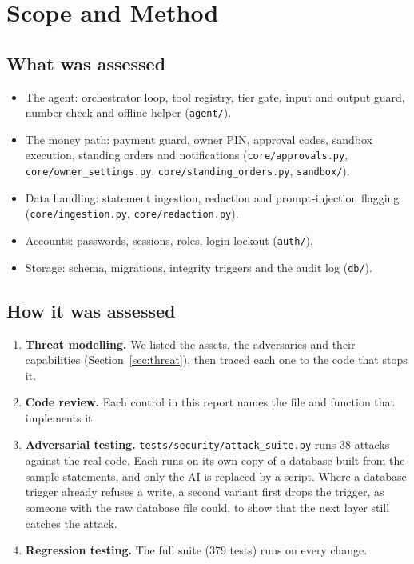 \documentclass[10pt,a4paper]{article}
\newcommand{\code}[1]{\texttt{\small #1}}
\begin{document}
\section{Scope and Method}

\subsection{What was assessed}
\begin{itemize}
  \item The agent: orchestrator loop, tool registry, tier gate, input and output guard, number check and offline helper (\code{agent/}).
  \item The money path: payment guard, owner PIN, approval codes, sandbox execution, standing orders and notifications (\code{core/approvals.py}, \code{core/owner\_settings.py}, \code{core/standing\_orders.py}, \code{sandbox/}).
  \item Data handling: statement ingestion, redaction and prompt-injection flagging (\code{core/ingestion.py}, \code{core/redaction.py}).
  \item Accounts: passwords, sessions, roles, login lockout (\code{auth/}).
  \item Storage: schema, migrations, integrity triggers and the audit log (\code{db/}).
\end{itemize}

\subsection{How it was assessed}
\begin{enumerate}
  \item \textbf{Threat modelling.} We listed the assets, the adversaries and their capabilities (Section~\ref{sec:threat}), then traced each one to the code that stops it.
  \item \textbf{Code review.} Each control in this report names the file and function that implements it.
  \item \textbf{Adversarial testing.} \code{tests/security/attack\_suite.py} runs 38 attacks against the real code. Each runs on its own copy of a database built from the sample statements, and only the AI is replaced by a script. Where a database trigger already refuses a write, a second variant first drops the trigger, as someone with the raw database file could, to show that the next layer still catches the attack.
  \item \textbf{Regression testing.} The full suite (379 tests) runs on every change.
\end{enumerate}
\end{document}
